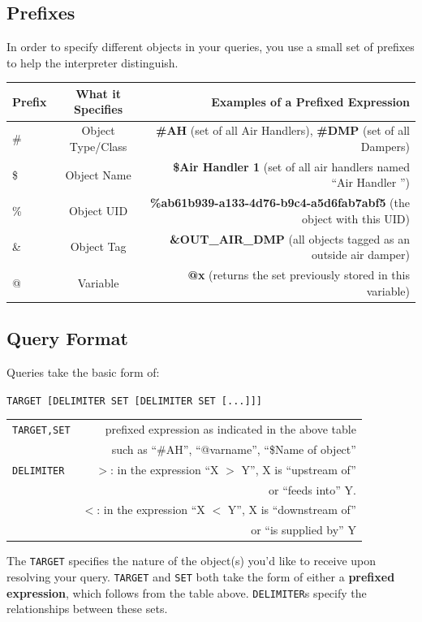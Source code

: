 \documentclass{article}
\begin{document}
\subsection{Prefixes} %
\label{sub:prefixes}
In order to specify different objects in your queries, you use a small set of prefixes to help the interpreter distinguish.
\begin{center}
\begin{tabular}{| l | c | r |}
\hline
Prefix & What it Specifies & Examples of a {\bf Prefixed Expression}  \\ \hline
\#	&	Object Type/Class & \textbf{\#AH} (set of all Air Handlers), \textbf{\#DMP} (set of all Dampers) \\ \hline
\$ 	&	Object Name	& \textbf{\$Air Handler 1} (set of all air handlers named ``Air Handler '') \\ \hline
\%	&	Object UID & \textbf{\%ab61b939-a133-4d76-b9c4-a5d6fab7abf5} (the object with this UID) \\ \hline
\&  &	Object Tag & \textbf{\&OUT\_AIR\_DMP} (all objects tagged as an outside air damper) \\ \hline
@	&	Variable	& \textbf{@x} (returns the set previously stored in this variable) \\ \hline
\end{tabular}
\end{center}

\subsection{Query Format} %
\label{sub:query_format}
Queries take the basic form of:
\begin{center}
\verb+TARGET [DELIMITER SET [DELIMITER SET [...]]]+

\verb++

\begin{tabular}{| l | r |}
\hline
\verb+TARGET,SET+ & prefixed expression as indicated in the above table \\
& such as ``\#AH'', ``@varname'', ``\$Name of object'' \\ \hline
\verb+DELIMITER+& $>$: in the expression ``X $>$ Y'', X is ``upstream of'' \\
& or ``feeds into'' Y. \\
& $<$: in the expression ``X $<$ Y'', X is ``downstream of'' \\
& or ``is supplied by'' Y \\ \hline
\end{tabular}
\end{center}
The \verb+TARGET+ specifies the nature of the object(s) you'd like to receive upon resolving your query. \verb+TARGET+ and \verb+SET+ both take the form of either a {\bf prefixed expression}, which follows from the table above. \verb+DELIMITER+s specify the relationships between these sets.
\end{document}
